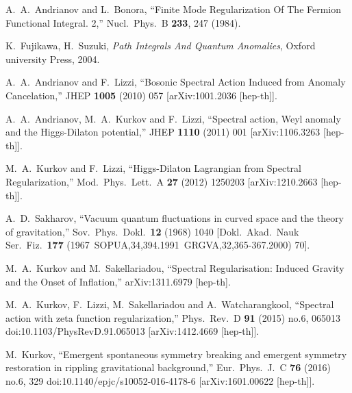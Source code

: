 \documentclass[12pt,a4paper]{article}
\begin{document}
\begin{thebibliography}{99}
  A.~A.~Andrianov and L.~Bonora,
  ``Finite Mode Regularization Of The Fermion Functional Integral. 2,''
  Nucl.\ Phys.\  B {\bf 233}, 247 (1984).


 K.~Fujikawa, H.~Suzuki, {\it Path
    Integrals And Quantum Anomalies}, Oxford university Press, 2004.


  A.~A.~Andrianov and F.~Lizzi,
  ``Bosonic Spectral Action Induced from Anomaly Cancelation,''
  JHEP {\bf 1005} (2010) 057
  [arXiv:1001.2036 [hep-th]].

  A.~A.~Andrianov, M.~A.~Kurkov and F.~Lizzi,
  ``Spectral action, Weyl anomaly and the Higgs-Dilaton potential,''
  JHEP {\bf 1110} (2011) 001
  [arXiv:1106.3263 [hep-th]].
  
  M.~A.~Kurkov and F.~Lizzi,
  ``Higgs-Dilaton Lagrangian from Spectral Regularization,''
  Mod.\ Phys.\ Lett.\ A {\bf 27} (2012) 1250203
  [arXiv:1210.2663 [hep-th]].

 A.~D.~Sakharov,
  ``Vacuum quantum fluctuations in curved space and the theory of
  gravitation,''
  Sov.\ Phys.\ Dokl.\  {\bf 12} (1968) 1040
  [Dokl.\ Akad.\ Nauk Ser.\ Fiz.\  {\bf 177} (1967\ SOPUA,34,394.1991\ GRGVA,32,365-367.2000) 70].


  M.~A.~Kurkov and M.~Sakellariadou,
  ``Spectral Regularisation: Induced Gravity and the Onset of Inflation,''
  arXiv:1311.6979 [hep-th].


   M.~A.~Kurkov, F.~Lizzi, M.~Sakellariadou and A.~Watcharangkool,
  ``Spectral action with zeta function regularization,''
  Phys.\ Rev.\ D {\bf 91} (2015) no.6,  065013
  doi:10.1103/PhysRevD.91.065013
  [arXiv:1412.4669 [hep-th]].
  
M.~Kurkov,
  ``Emergent spontaneous symmetry breaking and emergent symmetry restoration in rippling gravitational background,''
  Eur.\ Phys.\ J.\ C {\bf 76} (2016) no.6,  329
  doi:10.1140/epjc/s10052-016-4178-6
  [arXiv:1601.00622 [hep-th]].


\end{thebibliography}
\end{document}
